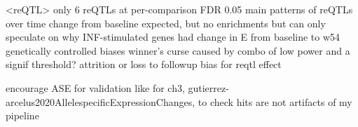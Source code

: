 \begin{outline}
\1 <reQTL>
    \2 only 6 reQTLs at per-comparison FDR 0.05
     main patterns of reQTLs over time
    \2 change from baseline expected, but no enrichments
    \2 but can only speculate on why INF-stimulated genes had change in E from baseline to w54 genetically controlled
    \2 biases
        \3 winner's curse caused by combo of low power and a signif threshold?
        \3 attrition or loss to followup bias for reqtl effect




    \2 encourage ASE for validation like for ch3, gutierrez-arcelus2020AllelespecificExpressionChanges, to check hits are not artifacts of my pipeline


\end{outline}
